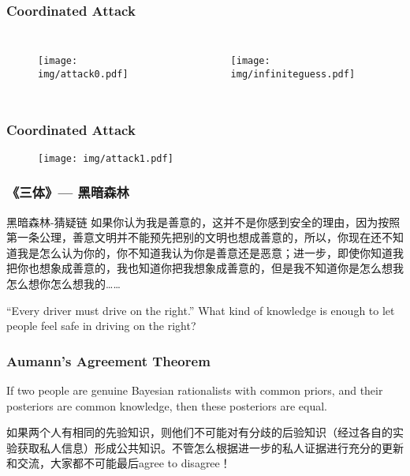 \documentclass[UTF8,11pt,colorlinks,compress,openany]{beamer}%
\begin{document}
\begin{frame}\frametitle{Coordinated Attack}
\vspace*{-3ex}
	\begin{columns}
		\begin{figure}[H]
			\texttt{[image: img/attack0.pdf]}
		\end{figure}
		\begin{figure}[H]
			\texttt{[image: img/infiniteguess.pdf]}
		\end{figure}
	\end{columns}
\end{frame}

\begin{frame}\frametitle{Coordinated Attack}
	\begin{figure}[H]
		\texttt{[image: img/attack1.pdf]}
	\end{figure}
\end{frame}

\begin{frame}\frametitle{《三体》--- 黑暗森林}
\begin{block}{黑暗森林-猜疑链}
如果你认为我是善意的，这并不是你感到安全的理由，因为按照第一条公理，善意文明并不能预先把别的文明也想成善意的，所以，你现在还不知道我是怎么认为你的，你不知道我认为你是善意还是恶意；进一步，即使你知道我把你也想象成善意的，我也知道你把我想象成善意的，但是我不知道你是怎么想我怎么想你怎么想我的……
\end{block}
\begin{block}{``Every driver must drive on the right.''}
What kind of knowledge is enough to let people feel safe in driving on the right?
\end{block}
\end{frame}

\begin{frame}\frametitle{Aumann's Agreement Theorem}
\begin{theorem}
If two people are genuine Bayesian rationalists with common priors, and their posteriors are common knowledge, then these posteriors are equal.
\end{theorem}
如果两个人有相同的先验知识，则他们不可能对有分歧的后验知识（经过各自的实验获取私人信息）形成公共知识。不管怎么根据进一步的私人证据进行充分的更新和交流，大家都不可能最后agree to disagree！
\end{frame}
\end{document}
